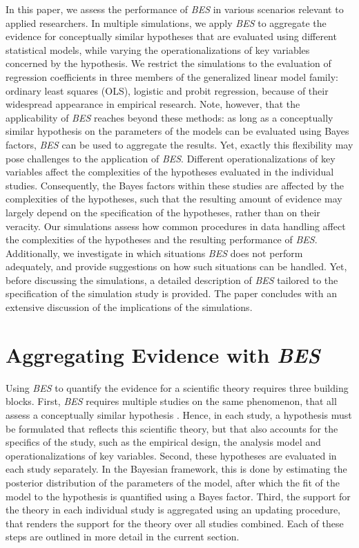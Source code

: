 \documentclass[review, 3p, authoryear]{elsarticle} %
\begin{document}
In this paper, we assess the performance of \emph{BES} in various scenarios relevant to applied researchers.
In multiple simulations, we apply \emph{BES} to aggregate the evidence for conceptually similar hypotheses that are evaluated using different statistical models, while varying the operationalizations of key variables concerned by the hypothesis.
We restrict the simulations to the evaluation of regression coefficients in three members of the generalized linear model family: ordinary least squares (OLS), logistic and probit regression, because of their widespread appearance in empirical research.
Note, however, that the applicability of \emph{BES} reaches beyond these methods: as long as a conceptually similar hypothesis on the parameters of the models can be evaluated using Bayes factors, \emph{BES} can be used to aggregate the results.
Yet, exactly this flexibility may pose challenges to the application of \emph{BES}.
Different operationalizations of key variables affect the complexities of the hypotheses evaluated in the individual studies.
Consequently, the Bayes factors within these studies are affected by the complexities of the hypotheses, such that the resulting amount of evidence may largely depend on the specification of the hypotheses, rather than on their veracity.
Our simulations assess how common procedures in data handling affect the complexities of the hypotheses and the resulting performance of \emph{BES}.
Additionally, we investigate in which situations \emph{BES} does not perform adequately, and provide suggestions on how such situations can be handled.
Yet, before discussing the simulations, a detailed description of \emph{BES} tailored to the specification of the simulation study is provided.
The paper concludes with an extensive discussion of the implications of the simulations.

\hypertarget{aggregating-evidence-with-bes}{%
\section{\texorpdfstring{Aggregating Evidence with \emph{BES}}{Aggregating Evidence with BES}}\label{aggregating-evidence-with-bes}}

Using \emph{BES} to quantify the evidence for a scientific theory requires three building blocks.
First, \emph{BES} requires multiple studies on the same phenomenon, that all assess a conceptually similar hypothesis \citep{kuiper_combining_2013}.
Hence, in each study, a hypothesis must be formulated that reflects this scientific theory, but that also accounts for the specifics of the study, such as the empirical design, the analysis model and operationalizations of key variables.
Second, these hypotheses are evaluated in each study separately.
In the Bayesian framework, this is done by estimating the posterior distribution of the parameters of the model, after which the fit of the model to the hypothesis is quantified using a Bayes factor.
Third, the support for the theory in each individual study is aggregated using an updating procedure, that renders the support for the theory over all studies combined.
Each of these steps are outlined in more detail in the current section.
\end{document}
